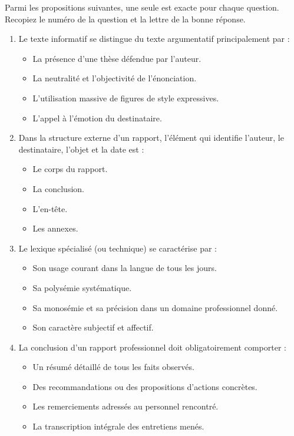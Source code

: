 \documentclass[11pt]{article}
\begin{document}
\begin{exercice}
Parmi les propositions suivantes, une seule est exacte pour chaque question. Recopiez le numéro de la question et la lettre de la bonne réponse.
\begin{enumerate}
\item Le texte informatif se distingue du texte argumentatif principalement par :
\begin{itemize}
\item[A.] La présence d'une thèse défendue par l'auteur.
\item[B.] La neutralité et l'objectivité de l'énonciation.
\item[C.] L'utilisation massive de figures de style expressives.
\item[D.] L'appel à l'émotion du destinataire.
\end{itemize}
\item Dans la structure externe d'un rapport, l'élément qui identifie l'auteur, le destinataire, l'objet et la date est :
\begin{itemize}
\item[A.] Le corps du rapport.
\item[B.] La conclusion.
\item[C.] L'en-tête.
\item[D.] Les annexes.
\end{itemize}
\item Le lexique spécialisé (ou technique) se caractérise par :
\begin{itemize}
\item[A.] Son usage courant dans la langue de tous les jours.
\item[B.] Sa polysémie systématique.
\item[C.] Sa monosémie et sa précision dans un domaine professionnel donné.
\item[D.] Son caractère subjectif et affectif.
\end{itemize}
\item La conclusion d'un rapport professionnel doit obligatoirement comporter :
\begin{itemize}
\item[A.] Un résumé détaillé de tous les faits observés.
\item[B.] Des recommandations ou des propositions d'actions concrètes.
\item[C.] Les remerciements adressés au personnel rencontré.
\item[D.] La transcription intégrale des entretiens menés.
\end{itemize}
\end{enumerate}
\end{exercice}
\end{document}
